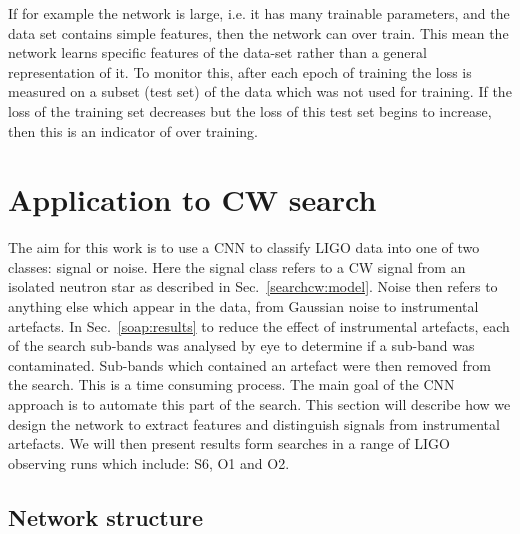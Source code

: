 If for example the network is large, i.e. it has many trainable parameters, and the data set contains simple features, then the network can over train.
This mean the network learns specific features of the data-set rather than a general representation of it. 
To monitor this, after each epoch of training the loss is measured on a subset (test set) of the data which was not used for training. 
If the loss of the training set decreases but the loss of this test set begins to increase, then this is an indicator of over training. 






\section{\label{machine:cw}Application to CW search}

The aim for this work is to use a \ac{CNN} to classify \ac{LIGO} data into one of two classes: signal or noise.
Here the signal class refers to a \ac{CW} signal from an isolated neutron star as described in Sec.~\ref{searchcw:model}.
Noise then refers to anything else which appear in the data, from Gaussian noise to instrumental artefacts. 
In Sec.~\ref{soap:results} to reduce the effect of instrumental artefacts, each of the search sub-bands was analysed by eye to determine if a sub-band was contaminated. 
Sub-bands which contained an artefact were then removed from the search.
This is a time consuming process. The main goal of the \ac{CNN} approach is to automate this part of the search.
This section will describe how we design the network to extract features and distinguish signals from instrumental artefacts.
We will then present results form searches in a range of \ac{LIGO} observing runs which include: S6, O1 and O2.


\subsection{\label{machine:cw:structure}Network structure}

